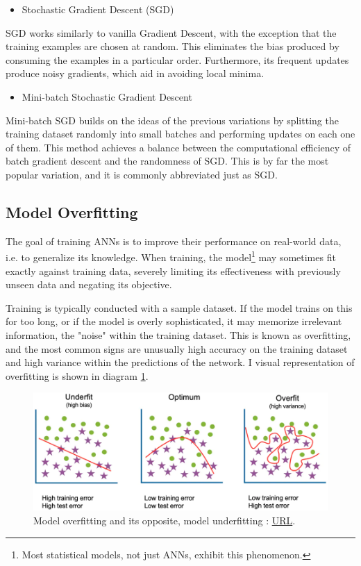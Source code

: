 \begin{itemize}[resume]
    \item Stochastic Gradient Descent (SGD)
\end{itemize}
SGD works similarly to vanilla Gradient Descent, with the exception that the training examples are chosen at random. This eliminates the bias produced by consuming the examples in a particular order. Furthermore, its frequent updates produce noisy gradients, which aid in avoiding local minima.
    
\begin{itemize}[resume]
    \item Mini-batch Stochastic Gradient Descent
\end{itemize}
Mini-batch SGD builds on the ideas of the previous variations by splitting the training dataset randomly into small batches and performing updates on each one of them. This method achieves a balance between the computational efficiency of batch gradient descent and the randomness of SGD. This is by far the most popular variation, and it is commonly abbreviated just as SGD.

\subsection{Model Overfitting}
The goal of training ANNs is to improve their performance on real-world data, i.e. to generalize its knowledge. When training, the model\footnote{Most statistical models, not just ANNs, exhibit this phenomenon.} may sometimes fit exactly against training data, severely limiting its effectiveness with previously unseen data and negating its objective.

Training is typically conducted with a sample dataset. If the model trains on this for too long, or if the model is overly sophisticated, it may memorize irrelevant information, the "noise" within the training dataset. This is known as overfitting\cite{IBM_overfitting}, and the most common signs are unusually high accuracy on the training dataset and high variance within the predictions of the network. I visual representation of overfitting is shown in diagram \ref{fig:Model overfitting}.
\begin{figure}[H]
    \centering
        \includegraphics[width=1\textwidth]{Images/diagrams/model-over-fitting.png}
        \decoRule
        \caption[Model overfitting]{Model overfitting and its opposite, model underfitting \cite{IBM_overfitting}: \href{https://www.ibm.com/cloud/learn/overfitting}{URL}.}
        \label{fig:Model overfitting}
\end{figure}

